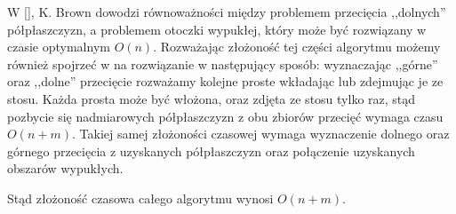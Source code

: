 W [], K. Brown dowodzi równoważności między problemem przecięcia
,,dolnych'' półpłaszczyzn, a problemem otoczki wypukłej, który może
być rozwiązany w czasie optymalnym $O(n)$. Rozważając złożoność tej
części algorytmu możemy również spojrzeć w na rozwiązanie w
następujący sposób: wyznaczając ,,górne'' oraz ,,dolne'' przecięcie
rozważamy kolejne proste wkładając lub zdejmując je ze stosu. Każda
prosta może być włożona, oraz zdjęta ze stosu tylko raz, stąd pozbycie
się nadmiarowych półpłaszczyzn z obu zbiorów przecięć wymaga czasu
$O(n + m)$. Takiej samej złożoności czasowej wymaga wyznaczenie
dolnego oraz górnego przecięcia z uzyskanych półpłaszczyzn oraz
połączenie uzyskanych obszarów wypukłych.

Stąd złożoność czasowa całego algorytmu wynosi $O(n + m)$.

